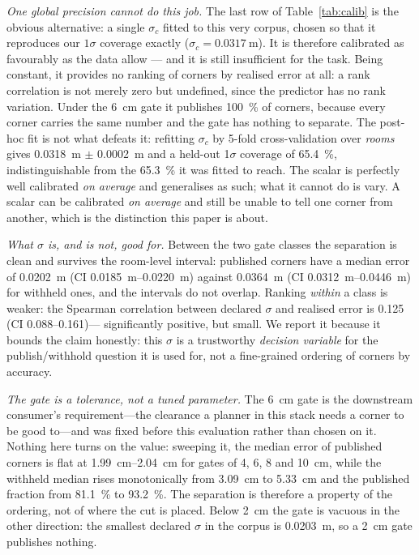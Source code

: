 \documentclass[conference,letterpaper,10pt]{IEEEtran}
\begin{document}
\emph{One global precision cannot do this job.} The last row of Table~\ref{tab:calib} is the
obvious alternative: a single $\sigma_c$ fitted to this very corpus, chosen so that it reproduces our
$1\sigma$ coverage exactly ($\sigma_c=\SI{0.0317}{\meter}$). It is therefore calibrated as favourably
as the data allow --- and it is still insufficient for the task. Being constant, it provides no
ranking of corners by realised error at all: a rank correlation is not merely zero but undefined,
since the predictor has no rank variation. Under the \SI{6}{\centi\meter} gate it publishes
\SI{100}{\percent} of corners, because every corner carries the same number and the gate has nothing
to separate. The post-hoc fit is not what defeats it: refitting $\sigma_c$ by \num{5}-fold
cross-validation over \emph{rooms} gives \SI{0.0318}{\meter} $\pm$ \SI{0.0002}{\meter} and a held-out
\num{1}$\sigma$ coverage of \SI{65.4}{\percent}, indistinguishable from the \SI{65.3}{\percent} it was
fitted to reach. The scalar is perfectly well calibrated \emph{on average} and generalises as such;
what it cannot do is vary. A scalar can be calibrated \emph{on average} and still be unable to tell one corner from
another, which is the distinction this paper is about.

\emph{What $\sigma$ is, and is not, good for.} Between the two gate classes the separation is clean
and survives the room-level interval: published corners have a median error of
\SI{0.0202}{\meter} (CI \SIrange{0.0185}{0.0220}{\meter}) against \SI{0.0364}{\meter}
(CI \SIrange{0.0312}{0.0446}{\meter}) for withheld ones, and the intervals do not overlap. Ranking
\emph{within} a class is weaker: the Spearman correlation between declared $\sigma$ and realised error
is \num{0.125} (CI \numrange{0.088}{0.161})--- significantly positive, but small. We report it
because it bounds the claim honestly: this $\sigma$ is a trustworthy \emph{decision variable} for the
publish/withhold question it is used for, not a fine-grained ordering of corners by accuracy.

\emph{The gate is a tolerance, not a tuned parameter.} The \SI{6}{\centi\meter} gate is the
downstream consumer's requirement---the clearance a planner in this stack needs a corner to be good
to---and was fixed before this evaluation rather than chosen on it. Nothing here turns on the value:
sweeping it, the median error of published corners is flat at \SIrange{1.99}{2.04}{\centi\meter} for
gates of \num{4}, \num{6}, \num{8} and \SI{10}{\centi\meter}, while the withheld median rises
monotonically from \SI{3.09}{\centi\meter} to \SI{5.33}{\centi\meter} and the published fraction from
\SI{81.1}{\percent} to \SI{93.2}{\percent}. The separation is therefore a property of the ordering,
not of where the cut is placed. Below \SI{2}{\centi\meter} the gate is vacuous in the other
direction: the smallest declared $\sigma$ in the corpus is \SI{0.0203}{\meter}, so a
\SI{2}{\centi\meter} gate publishes nothing.
\end{document}
